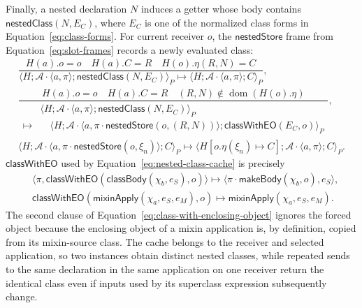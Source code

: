 \documentclass[11pt]{article}
\numberwithin{equation}{section}
\newcommand{\kw}[1]{\ensuremath{\mathsf{#1}}}
\newcommand{\dom}{\mathop{\mathrm{dom}}}
\begin{document}
Finally, a nested declaration $N$ induces a getter whose body contains
$\kw{nestedClass}(N,E_C)$, where $E_C$ is one of the normalized class forms in
Equation~\eqref{eq:class-forms}.  For
current receiver $o$, the $\kw{nestedStore}$ frame from
Equation~\eqref{eq:slot-frames} records a newly evaluated class:
\begin{equation}\label{eq:nested-class-cache}
\begin{array}{c}
\dfrac{H(a).o=o\quad H(a).C=R\quad H(o).\eta(R,N)=C}
 {\langle H;\mathcal A\cdot\langle a,\pi\rangle;
    \kw{nestedClass}(N,E_C)\rangle_P
  \longmapsto
  \langle H;\mathcal A\cdot\langle a,\pi\rangle;C\rangle_P},\\[4mm]
\dfrac{H(a).o=o\quad H(a).C=R\quad (R,N)\notin\dom(H(o).\eta)}
 {\begin{aligned}
  &\langle H;\mathcal A\cdot\langle a,\pi\rangle;
    \kw{nestedClass}(N,E_C)\rangle_P\\[-1mm]
  \longmapsto
  &\quad\langle H;\mathcal A\cdot
    \langle a,\pi\cdot\kw{nestedStore}(o,(R,N))\rangle;
    \kw{classWithEO}(E_C,o)\rangle_P
  \end{aligned}},\\[4mm]
 \langle H;\mathcal A\cdot
    \langle a,\pi\cdot\kw{nestedStore}(o,\xi_n)\rangle;C\rangle_P
 \longmapsto
 \langle H[o.\eta(\xi_n)\mapsto C];
    \mathcal A\cdot\langle a,\pi\rangle;C\rangle_P.
\end{array}
\end{equation}
$\kw{classWithEO}$ used by Equation~\eqref{eq:nested-class-cache} is precisely
\begin{equation}\label{eq:class-with-enclosing-object}
\begin{aligned}
 &\langle\pi,\kw{classWithEO}
       (\kw{classBody}(\chi_b,e_S),o)\rangle
   \longmapsto\langle\pi\cdot\kw{makeBody}(\chi_b,o),e_S\rangle,\\
 &\kw{classWithEO}(\kw{mixinApply}(\chi_a,e_S,e_M),o)
   \longmapsto\kw{mixinApply}(\chi_a,e_S,e_M).
\end{aligned}
\end{equation}
The second clause of Equation~\eqref{eq:class-with-enclosing-object} ignores the
forced object because the enclosing object of a
mixin application is, by definition, copied from its mixin-source class.  The
cache belongs to the receiver and selected application, so two
instances obtain distinct nested classes, while repeated sends to the same
declaration in the same application on one receiver
return the identical class even if inputs used by its superclass expression
subsequently change.
\end{document}
